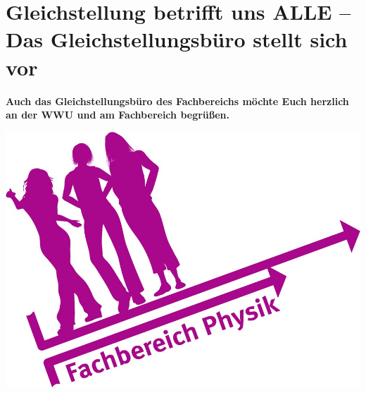 \section[Gleichstellungsbüro am FB11]{Gleichstellung betrifft uns ALLE – Das Gleichstellungsbüro stellt sich vor}

\begin{multicols}{2}

\textbf{Auch das Gleichstellungsbüro des Fachbereichs möchte Euch herzlich an der WWU und am Fachbereich begrüßen.}

\includegraphics[width=\columnwidth]{res/gst_buero.jpg}

\end{multicols}

